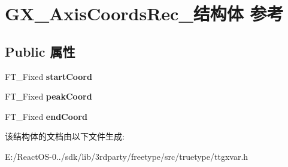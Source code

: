 \hypertarget{struct_g_x___axis_coords_rec__}{}\section{G\+X\+\_\+\+Axis\+Coords\+Rec\+\_\+结构体 参考}
\label{struct_g_x___axis_coords_rec__}
\subsection*{Public 属性}
\begin{DoxyCompactItemize}
\item 
\mbox{\label{struct_g_x___axis_coords_rec___a2b68aeaf48df7c60967c999bf828b637}} 
F\+T\+\_\+\+Fixed {\bfseries start\+Coord}
\item 
\mbox{\label{struct_g_x___axis_coords_rec___a4f76ed30de9079855207f264d928d052}} 
F\+T\+\_\+\+Fixed {\bfseries peak\+Coord}
\item 
\mbox{\label{struct_g_x___axis_coords_rec___a6420c5c3beeea87603870702bfc30e2f}} 
F\+T\+\_\+\+Fixed {\bfseries end\+Coord}
\end{DoxyCompactItemize}


该结构体的文档由以下文件生成\+:\begin{DoxyCompactItemize}
\item 
E\+:/\+React\+O\+S-\/0../sdk/lib/3rdparty/freetype/src/truetype/ttgxvar.\+h\end{DoxyCompactItemize}
